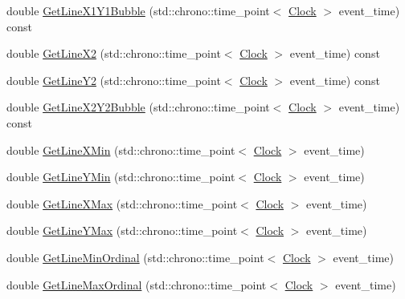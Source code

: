 \begin{DoxyCompactItemize}
\item 
double \mbox{\hyperlink{class_line_adc3c6c42d1b3d172e32fad59db2e3eaa}{Get\+Line\+X1\+Y1\+Bubble}} (std\+::chrono\+::time\+\_\+point$<$ \mbox{\hyperlink{universe_8h_a0ef8d951d1ca5ab3cfaf7ab4c7a6fd80}{Clock}} $>$ event\+\_\+time) const
\item 
double \mbox{\hyperlink{class_line_a9cdf38d7aaeadfa35136dd417865c189}{Get\+Line\+X2}} (std\+::chrono\+::time\+\_\+point$<$ \mbox{\hyperlink{universe_8h_a0ef8d951d1ca5ab3cfaf7ab4c7a6fd80}{Clock}} $>$ event\+\_\+time) const
\item 
double \mbox{\hyperlink{class_line_a6222d15f883f3183ec9eed085046916a}{Get\+Line\+Y2}} (std\+::chrono\+::time\+\_\+point$<$ \mbox{\hyperlink{universe_8h_a0ef8d951d1ca5ab3cfaf7ab4c7a6fd80}{Clock}} $>$ event\+\_\+time) const
\item 
double \mbox{\hyperlink{class_line_a2432406f734963e4497541081a843131}{Get\+Line\+X2\+Y2\+Bubble}} (std\+::chrono\+::time\+\_\+point$<$ \mbox{\hyperlink{universe_8h_a0ef8d951d1ca5ab3cfaf7ab4c7a6fd80}{Clock}} $>$ event\+\_\+time) const
\item 
double \mbox{\hyperlink{class_line_ac4a6e8f232b529169d91b9f44496933b}{Get\+Line\+X\+Min}} (std\+::chrono\+::time\+\_\+point$<$ \mbox{\hyperlink{universe_8h_a0ef8d951d1ca5ab3cfaf7ab4c7a6fd80}{Clock}} $>$ event\+\_\+time)
\item 
double \mbox{\hyperlink{class_line_ae8151f5f3b102924b09de686f536e220}{Get\+Line\+Y\+Min}} (std\+::chrono\+::time\+\_\+point$<$ \mbox{\hyperlink{universe_8h_a0ef8d951d1ca5ab3cfaf7ab4c7a6fd80}{Clock}} $>$ event\+\_\+time)
\item 
double \mbox{\hyperlink{class_line_a1393a4dcd9fa9e1ab1653c37d76c8c3a}{Get\+Line\+X\+Max}} (std\+::chrono\+::time\+\_\+point$<$ \mbox{\hyperlink{universe_8h_a0ef8d951d1ca5ab3cfaf7ab4c7a6fd80}{Clock}} $>$ event\+\_\+time)
\item 
double \mbox{\hyperlink{class_line_ab033cff3a24b67be829759d16f13c281}{Get\+Line\+Y\+Max}} (std\+::chrono\+::time\+\_\+point$<$ \mbox{\hyperlink{universe_8h_a0ef8d951d1ca5ab3cfaf7ab4c7a6fd80}{Clock}} $>$ event\+\_\+time)
\item 
double \mbox{\hyperlink{class_line_a7b105f0af704489446cc93302c30813d}{Get\+Line\+Min\+Ordinal}} (std\+::chrono\+::time\+\_\+point$<$ \mbox{\hyperlink{universe_8h_a0ef8d951d1ca5ab3cfaf7ab4c7a6fd80}{Clock}} $>$ event\+\_\+time)
\item 
double \mbox{\hyperlink{class_line_a3fc7779998759b641ec2b7bc8515563a}{Get\+Line\+Max\+Ordinal}} (std\+::chrono\+::time\+\_\+point$<$ \mbox{\hyperlink{universe_8h_a0ef8d951d1ca5ab3cfaf7ab4c7a6fd80}{Clock}} $>$ event\+\_\+time)

\end{DoxyCompactItemize}
